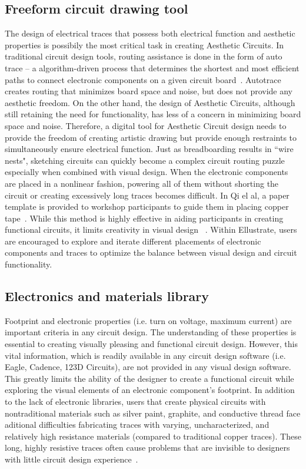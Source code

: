 \documentclass{sigchi}
\begin{document}
\subsection{Freeform circuit drawing tool}
The design of electrical traces that possess both electrical function and aesthetic properties is possibily the most critical task in creating Aesthetic Circuits. In traditional circuit design tools, routing assistance is done in the form of auto trace -- a algorithm-driven process that determines the shortest and most efficient paths to connect electronic components on a given circuit board~\cite{Fisk:1965tk}. Autotrace creates routing that minimizes board space and noise, but does not provide any aesthetic freedom. On the other hand, the design of Aesthetic Circuits, although still retaining the need for functionality, has less of a concern in minimizing board space and noise. Therefore, a digital tool for Aesthetic Circuit design needs to provide the freedom of creating artistic drawing but provide enough restraints to simultaneously ensure electrical function. Just as breadboarding results in ``wire nests", sketching circuits can quickly become a complex circuit routing puzzle especially when combined with visual design.
When the electronic components are placed in a nonlinear fashion, powering all of them without shorting the circuit or creating excessively long traces becomes difficult. In Qi el al, a paper template is provided to workshop participants to guide them in placing copper tape~\cite{Qi:2014bg}. While this method is highly effective in aiding participants in creating functional circuits, it limits creativity in visual design ~\cite{Qi:2014bg}. Within Ellustrate, users are encouraged to explore and iterate different placements of electronic components and traces to optimize the balance between visual design and circuit functionality. 

\subsection{Electronics and materials library}
Footprint and electronic properties (i.e. turn on voltage, maximum current) are important criteria in any circuit design. The understanding of these properties is essential to creating visually pleasing and functional circuit design. However, this vital information, which is readily available in any circuit design software (i.e. Eagle, Cadence, 123D Circuits), are not provided in any visual design software. This greatly limits the ability of the designer to create a functional circuit while exploring the visual elements of an electronic component's footprint. In addition to the lack of electronic libraries, users that create physical circuits with nontraditional materials such as silver paint, graphite, and conductive thread face aditional difficulties fabricating traces with varying, uncharacterized, and relatively high resistance materials (compared to traditional copper traces). These long, highly resistive traces often cause problems that are invisible to designers with little circuit design experience~\cite{admin:2009wf}. 
\end{document}
